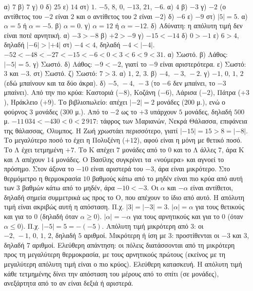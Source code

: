  α) $7$ \quad β) $7$ \quad γ) $0$ \quad δ) $25$ \quad ε) $14$ \quad στ) $1$.
 $-5$, $8$, $0$, $-13$, $21$, $-6$.
 α) $4$ \quad β) $-3$ \quad γ) $-2$ (ο αντίθετος του $-2$ είναι $2$ και ο αντίθετος του $2$ είναι $-2$) \quad δ) $-6$ \quad ε) $-9$ \quad στ) $|5|=5$.
 α) $\alpha=5$ ή $\alpha=-5$. β) $\alpha=0$. γ) $\alpha=12$ ή $\alpha=-12$. δ) Αδύνατη: η απόλυτη τιμή δεν είναι ποτέ αρνητική.
 α) $-3>-8$ \quad β) $+2>-9$ \quad γ) $-15<-14$ \quad δ) $0>-1$ \quad ε) $6>4$, δηλαδή $|-6|>|+4|$ \quad στ) $-4<4$, δηλαδή $-4<|-4|$.
 $-52<-48<-27<-15<-6<0<3<6<9<31$.
 α) Σωστό. β) Λάθος: $|-5|=5$. γ) Σωστό. δ) Λάθος: $-9<-2$, γιατί το $-9$ είναι αριστερότερα. ε) Σωστό: $3$ και $-3$. στ) Σωστό. ζ) Σωστό: $7>3$.
 α) $1,\,2,\,3$. β) $-4,\,-3,\,-2$. γ) $-1,\,0,\,1,\,2$ (εδώ μπαίνουν και τα δύο άκρα). δ) $-5,\,-4,\,-3$ (το $-6$ δεν μπαίνει, το $-3$ μπαίνει).
 Από την πιο κρύα: Καστοριά ($-8$), Κοζάνη ($-6$), Λάρισα ($-2$), Πάτρα ($+3$), Ηράκλειο ($+9$).
 Το βιβλιοπωλείο: απέχει $|-2|=2$ μονάδες ($200$ μ.), ενώ ο φούρνος $3$ μονάδες ($300$ μ.). Από το $-2$ ως το $+3$ υπάρχουν $5$ μονάδες, δηλαδή $500$ μ.
 $-11\,034<-430<0<2\,917$: τάφρος των Μαριανών, Νεκρά Θάλασσα, επιφάνεια της θάλασσας, Όλυμπος.
 Η Ζωή χρωστάει περισσότερο, γιατί $|-15|=15>8=|-8|$. Το μεγαλύτερο ποσό το έχει η Πολυξένη ($+12$), αφού είναι η μόνη με θετικό ποσό.
 Το $\mathrm{Λ}$ έχει τετμημένη $+7$. Το $\mathrm{Κ}$ απέχει $7$ μονάδες από το $0$ και το $\mathrm{Λ}$ άλλες $7$, άρα $\mathrm{Κ}$ και $\mathrm{Λ}$ απέχουν $14$ μονάδες.
 Ο Βασίλης συγκρίνει τα «νούμερα» και αγνοεί το πρόσημο. Στον άξονα το $-10$ είναι αριστερά του $-3$, άρα είναι μικρότερο. Στο θερμόμετρο η θερμοκρασία $10$ βαθμούς κάτω από το μηδέν είναι πιο κρύα από αυτή των $3$ βαθμών κάτω από το μηδέν, άρα $-10<-3$.
 Οι $\alpha$ και $-\alpha$ είναι αντίθετοι, δηλαδή σημεία συμμετρικά ως προς το $\mathrm{Ο}$, που απέχουν το ίδιο από αυτό. Η απόλυτη τιμή είναι ακριβώς αυτή η απόσταση. Π.χ. $|3|=|-3|=3$.
 $|\alpha|=\alpha$ για τους θετικούς και για το $0$ (δηλαδή όταν $\alpha\ge0$). $|\alpha|=-\alpha$ για τους αρνητικούς και για το $0$ (όταν $\alpha\le0$). Π.χ. $|-5|=5=-(-5)$.
 Απόλυτη τιμή μικρότερη από $3$: οι $-2,\,-1,\,0,\,1,\,2$, δηλαδή $5$ αριθμοί. Μικρότερη ή ίση με $3$: προστίθενται οι $-3$ και $3$, δηλαδή $7$ αριθμοί.
 Ελεύθερη απάντηση: οι πόλεις διατάσσονται από τη μικρότερη προς τη μεγαλύτερη θερμοκρασία, με τους αρνητικούς πρώτους (εκείνος με τη μεγαλύτερη απόλυτη τιμή είναι ο πιο κρύος).
 Ελεύθερη κατασκευή. Η απόλυτη τιμή κάθε τετμημένης δίνει την απόσταση του μέρους από το σπίτι (σε μονάδες), ανεξάρτητα από το αν είναι δεξιά ή αριστερά.
